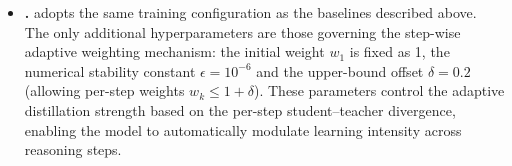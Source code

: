\begin{itemize}
    \item  \textbf{\ourmodel.}
\ourmodel adopts the same training configuration as the baselines described above. The only additional hyperparameters are those governing the step-wise adaptive weighting mechanism: the initial weight $w_1$ is fixed as 1, the numerical stability constant $\epsilon = 10^{-6}$ and the upper-bound offset $\delta = 0.2$ (allowing per-step weights $w_k \leq 1 + \delta$). These parameters control the adaptive distillation strength based on the per-step student--teacher divergence, enabling the model to automatically modulate learning intensity across reasoning steps.



\end{itemize}
